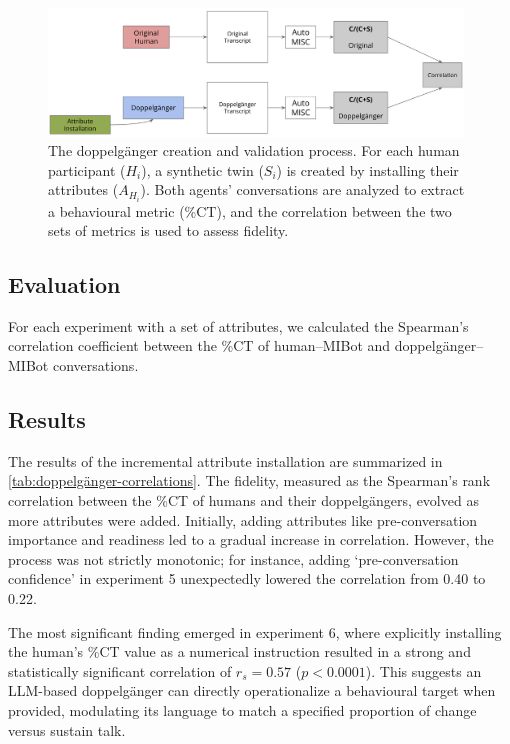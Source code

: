 \begin{figure}[htpb]
    \centering
    \includegraphics[width=0.98\textwidth]{fig/doppelganger_process.png}
    \caption{The doppelgänger creation and validation process. For each human participant ($H_i$), a synthetic twin ($S_i$) is created by installing their attributes ($A_{H_i}$). Both agents' conversations are analyzed to extract a behavioural metric (\%CT), and the correlation between the two sets of metrics is used to assess fidelity.}
    \label{fig:doppelgänger-creation-process}
\end{figure}


\subsection{Evaluation}
For each experiment with a set of attributes, we calculated the Spearman's correlation coefficient between the \%CT of human--MIBot and doppelgänger--MIBot conversations.



\subsection{Results}
The results of the incremental attribute installation are summarized in \cref{tab:doppelgänger-correlations}. The fidelity, measured as the Spearman's rank correlation between the \%CT of humans and their doppelgängers, evolved as more attributes were added. Initially, adding attributes like pre-conversation importance and readiness led to a gradual increase in correlation. However, the process was not strictly monotonic; for instance, adding `pre-conversation confidence' in experiment 5 unexpectedly lowered the correlation from 0.40 to 0.22.

The most significant finding emerged in experiment 6, where explicitly installing the human's \%CT value as a numerical instruction resulted in a strong and statistically significant correlation of $r_s = 0.57$ ($p < 0.0001$). This suggests an LLM-based doppelgänger can directly operationalize a behavioural target when provided, modulating its language to match a specified proportion of change versus sustain talk.

